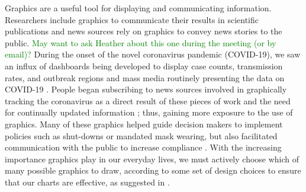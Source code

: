 \documentclass[]{interact}
\theoremstyle{plain}%
\theoremstyle{definition}
\theoremstyle{remark}
\begin{document}
Graphics are a useful tool for displaying and communicating information.
\citep{vanderplas2020testing} Researchers include graphics to
communicate their results in scientific publications and news sources
rely on graphics to convey news stories to the public.
\textcolor{Green}{May want to ask Heather about this one during the meeting (or by email)?}
During the onset of the novel coronavirus pandemic (COVID-19), we saw an
influx of dashboards being developed to display case counts,
transmission rates, and outbreak regions \citep{lisa_charlotte_2020} and
mass media routinely presenting the data on COVID-19
\textcolor{Plum}{\citep{romano_scale_2020}}. People began subscribing to
news sources involved in graphically tracking the coronavirus as a
direct result of these pieces of work and the need for continually
updated information \citep{rost_2020}; thus, gaining more exposure to
the use of graphics. Many of these graphics helped guide decision makers
to implement policies such as shut-downs or mandated mask wearing, but
also facilitated communication with the public to increase compliance
\textcolor{Plum}{\citep{bavel_using_2020}}. With the increasing
importance graphics play in our everyday lives, we must actively choose
which of many possible graphics to draw, according to some set of design
choices to ensure that our charts are effective, as suggested in
\citet{unwin_why_2020}.
\end{document}
